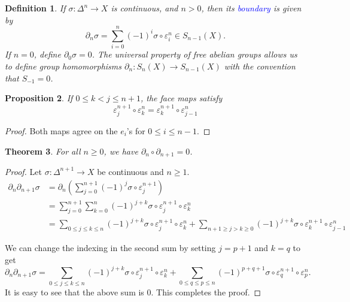 \documentclass[10pt]{article}
\theoremstyle{thmstyle}
\newtheorem{theorem}{Theorem}[section]
\newtheorem{proposition}[theorem]{Proposition}
\theoremstyle{defstyle}
\newtheorem{definition}[theorem]{Definition}
\newcommand{\define}[1]{\textcolor{blue}{\textit{#1}}}
\renewcommand{\le}{\leqslant}
\renewcommand{\ge}{\geqslant}
\begin{document}
\begin{definition}
    If $\sigma: \Delta^n\to X$ is continuous, and $n > 0$, then its \define{boundary} is given by 
    \begin{equation*}
        \partial_n\sigma = \sum_{i = 0}^n (-1)^i \sigma\circ\varepsilon_i^{n}\in S_{n - 1}(X).
    \end{equation*}
    If $n = 0$, define $\partial_0\sigma = 0$. The universal property of free abelian groups allows us to define group homomorphisms $\partial_n: S_n(X)\to S_{n - 1}(X)$ with the convention that $S_{-1} = 0$.
\end{definition}

\begin{proposition}
    If $0\le k < j\le n + 1$, the face maps satisfy 
    \begin{equation*}
        \varepsilon_j^{n + 1}\circ\varepsilon_k^{n} = \varepsilon_k^{n + 1}\circ\varepsilon^n_{j - 1}
    \end{equation*}
\end{proposition}
\begin{proof}
    Both maps agree on the $e_i$'s for $0\le i\le n - 1$.
\end{proof}

\begin{theorem}
    For all $n\ge 0$, we have $\partial_n\circ\partial_{n + 1} = 0$.
\end{theorem}
\begin{proof}
    Let $\sigma:\Delta^{n + 1}\to X$ be continuous and $n\ge 1$.
    \begin{align*}
        \partial_n\partial_{n + 1}\sigma &= \partial_n\left(\sum_{j = 0}^{n + 1} (-1)^j\sigma\circ\varepsilon^{n + 1}_j\right)\\
        &= \sum_{j = 0}^{n + 1}\sum_{k = 0}^{n} (-1)^{j + k}\sigma\circ\varepsilon_j^{n + 1}\circ\varepsilon_k^{n}\\
        &= \sum_{0\le j\le k\le n}(-1)^{j + k}\sigma\circ\varepsilon_j^{n + 1}\circ\varepsilon_k^{n} + \sum_{n + 1\ge j > k\ge 0}(-1)^{j + k}\sigma\circ\varepsilon_k^{n + 1}\circ\varepsilon^n_{j - 1}
    \end{align*}

    We can change the indexing in the second sum by setting $j = p + 1$ and $k = q$ to get 
    \begin{equation*}
        \partial_n\partial_{n + 1}\sigma = \sum_{0\le j\le k\le n}(-1)^{j + k}\sigma\circ\varepsilon^{n + 1}_j\circ\varepsilon^n_k + \sum_{0\le q\le p\le n}(-1)^{p + q  + 1}\sigma\circ\varepsilon^{n + 1}_q\circ\varepsilon^{n}_p.
    \end{equation*}
    It is easy to see that the above sum is $0$. This completes the proof.
\end{proof}
\end{document}
